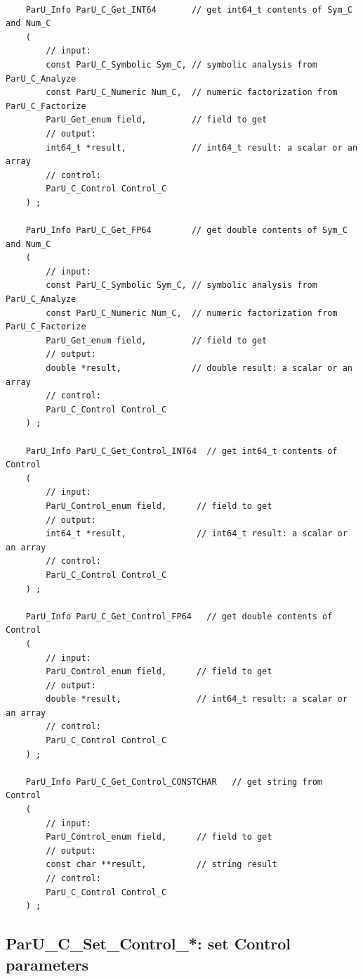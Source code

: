 \documentclass[12pt]{article}
\begin{document}
    {\footnotesize
    \begin{verbatim}

    ParU_Info ParU_C_Get_INT64       // get int64_t contents of Sym_C and Num_C
    (
        // input:
        const ParU_C_Symbolic Sym_C, // symbolic analysis from ParU_C_Analyze
        const ParU_C_Numeric Num_C,  // numeric factorization from ParU_C_Factorize
        ParU_Get_enum field,         // field to get
        // output:
        int64_t *result,             // int64_t result: a scalar or an array
        // control:
        ParU_C_Control Control_C
    ) ;

    ParU_Info ParU_C_Get_FP64        // get double contents of Sym_C and Num_C
    (
        // input:
        const ParU_C_Symbolic Sym_C, // symbolic analysis from ParU_C_Analyze
        const ParU_C_Numeric Num_C,  // numeric factorization from ParU_C_Factorize
        ParU_Get_enum field,         // field to get
        // output:
        double *result,              // double result: a scalar or an array
        // control:
        ParU_C_Control Control_C
    ) ;

    ParU_Info ParU_C_Get_Control_INT64  // get int64_t contents of Control
    (
        // input:
        ParU_Control_enum field,      // field to get
        // output:
        int64_t *result,              // int64_t result: a scalar or an array
        // control:
        ParU_C_Control Control_C
    ) ;

    ParU_Info ParU_C_Get_Control_FP64   // get double contents of Control
    (
        // input:
        ParU_Control_enum field,      // field to get
        // output:
        double *result,               // int64_t result: a scalar or an array
        // control:
        ParU_C_Control Control_C
    ) ;

    ParU_Info ParU_C_Get_Control_CONSTCHAR   // get string from Control
    (
        // input:
        ParU_Control_enum field,      // field to get
        // output:
        const char **result,          // string result
        // control:
        ParU_C_Control Control_C
    ) ; \end{verbatim} }


\subsection{{\sf ParU\_C\_Set\_Control\_*}: set Control parameters}
\end{document}
